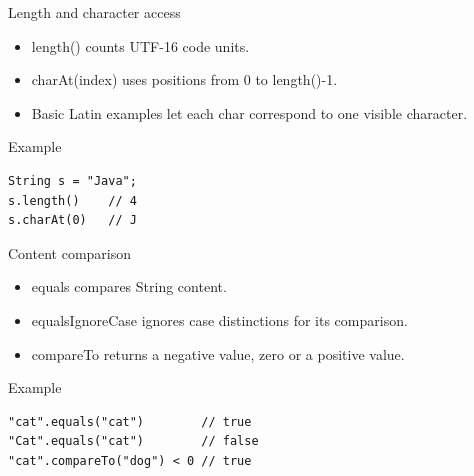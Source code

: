 \documentclass[10pt,aspectratio=169]{beamer}
\begin{document}
\begin{frame}[fragile,t]{Length and character access}
\begin{itemize}
\item length() counts UTF-16 code units.
\item charAt(index) uses positions from 0 to length()-1.
\item Basic Latin examples let each char correspond to one visible character.
\end{itemize}
\vspace{1mm}\begin{block}{Example}
\begin{lstlisting}
String s = "Java";
s.length()    // 4
s.charAt(0)   // J
\end{lstlisting}
\end{block}
\end{frame}

\begin{frame}[fragile,t]{Content comparison}
\begin{itemize}
\item equals compares String content.
\item equalsIgnoreCase ignores case distinctions for its comparison.
\item compareTo returns a negative value, zero or a positive value.
\end{itemize}
\vspace{1mm}\begin{block}{Example}
\begin{lstlisting}
"cat".equals("cat")        // true
"Cat".equals("cat")        // false
"cat".compareTo("dog") < 0 // true
\end{lstlisting}
\end{block}
\end{frame}
\end{document}
